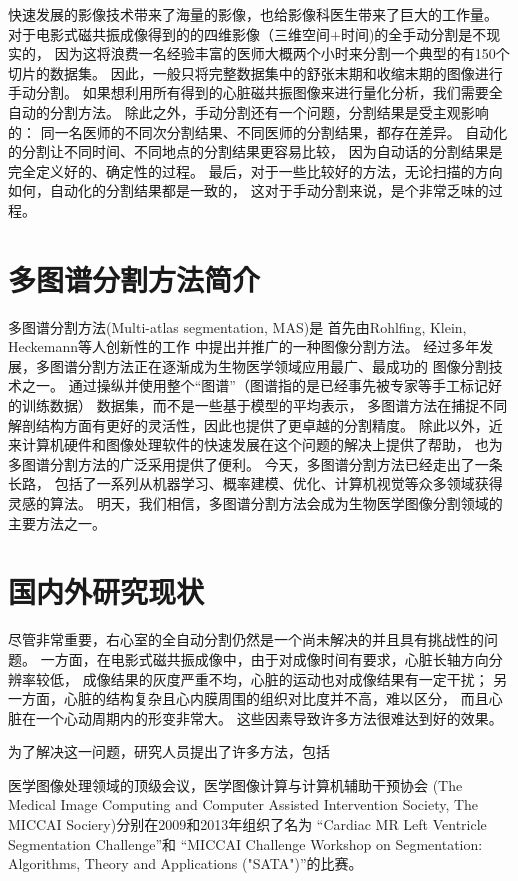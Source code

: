 快速发展的影像技术带来了海量的影像，也给影像科医生带来了巨大的工作量。
对于电影式磁共振成像得到的的四维影像（三维空间$+$时间)的全手动分割是不现实的，
因为这将浪费一名经验丰富的医师大概两个小时来分割一个典型的有150个切片的数据集。
因此，一般只将完整数据集中的舒张末期和收缩末期的图像进行手动分割。
如果想利用所有得到的心脏磁共振图像来进行量化分析，我们需要全自动的分割方法。
除此之外，手动分割还有一个问题，分割结果是受主观影响的：
同一名医师的不同次分割结果、不同医师的分割结果，都存在差异。
自动化的分割让不同时间、不同地点的分割结果更容易比较，
因为自动话的分割结果是完全定义好的、确定性的过程。
最后，对于一些比较好的方法，无论扫描的方向如何，自动化的分割结果都是一致的，
这对于手动分割来说，是个非常乏味的过程。


\section{多图谱分割方法简介}
多图谱分割方法(Multi-atlas segmentation, MAS)是
首先由Rohlfing, Klein, Heckemann等人创新性的工作
中提出并推广的一种图像分割方法。
经过多年发展，多图谱分割方法正在逐渐成为生物医学领域应用最广、最成功的
图像分割技术之一。
通过操纵并使用整个``图谱''（图谱指的是已经事先被专家等手工标记好的训练数据）
数据集，而不是一些基于模型的平均表示，
多图谱方法在捕捉不同解剖结构方面有更好的灵活性，因此也提供了更卓越的分割精度。
除此以外，近来计算机硬件和图像处理软件的快速发展在这个问题的解决上提供了帮助，
也为多图谱分割方法的广泛采用提供了便利。
今天，多图谱分割方法已经走出了一条长路，
包括了一系列从机器学习、概率建模、优化、计算机视觉等众多领域获得灵感的算法。
明天，我们相信，多图谱分割方法会成为生物医学图像分割领域的主要方法之一。


\section{国内外研究现状}

尽管非常重要，右心室的全自动分割仍然是一个尚未解决的并且具有挑战性的问题。
一方面，在电影式磁共振成像中，由于对成像时间有要求，心脏长轴方向分辨率较低，
成像结果的灰度严重不均，心脏的运动也对成像结果有一定干扰；
另一方面，心脏的结构复杂且心内膜周围的组织对比度并不高，难以区分，
而且心脏在一个心动周期内的形变非常大。
这些因素导致许多方法很难达到好的效果。

为了解决这一问题，研究人员提出了许多方法，包括

医学图像处理领域的顶级会议，医学图像计算与计算机辅助干预协会
(The Medical Image Computing and Computer Assisted Intervention Society,
The MICCAI Sociery)分别在2009和2013年组织了名为
``Cardiac MR Left Ventricle Segmentation Challenge''和
``MICCAI Challenge Workshop on Segmentation:
Algorithms, Theory and Applications ("SATA")''的比赛。


